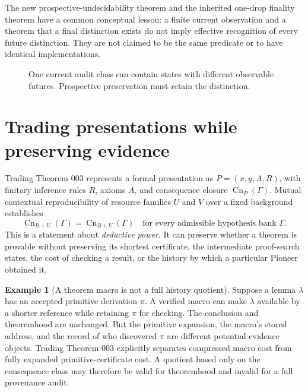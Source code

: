 \documentclass[11pt,letterpaper]{article}
\theoremstyle{definition}
\newtheorem{example}[theorem]{Example}
\begin{document}
The new prospective-undecidability theorem and the inherited one-drop finality theorem have a common conceptual lesson: a finite current observation and a theorem that a final distinction exists do not imply effective recognition of every future distinction. They are not claimed to be the same predicate or to have identical implementations.

\begin{figure}[htbp]\centering
{}
\caption{One current audit class can contain states with different observable futures. Prospective preservation must retain the distinction.}
\label{fig:future-split}
\end{figure}

\section{Trading presentations while preserving evidence}\label{sec:trades}
Trading Theorem 003 represents a formal presentation as $P=(x,y,A,R)$, with finitary inference rules $R$, axioms $A$, and consequence closure $\operatorname{Cn}_P(\Gamma)$. Mutual contextual reproducibility of resource families $U$ and $V$ over a fixed background establishes
\[
\operatorname{Cn}_{B+U}(\Gamma)=\operatorname{Cn}_{B+V}(\Gamma)
\quad\text{for every admissible hypothesis bank }\Gamma.
\]
This is a statement about \emph{deductive power}. It can preserve whether a theorem is provable without preserving its shortest certificate, the intermediate proof-search states, the cost of checking a result, or the history by which a particular Pioneer obtained it.

\begin{example}[A theorem macro is not a full history quotient]
Suppose a lemma $\lambda$ has an accepted primitive derivation $\pi$. A verified macro can make $\lambda$ available by a shorter reference while retaining $\pi$ for checking. The conclusion and theoremhood are unchanged. But the primitive expansion, the macro's stored address, and the record of who discovered $\pi$ are different potential evidence objects. Trading Theorem 003 explicitly separates compressed macro cost from fully expanded primitive-certificate cost. A quotient based only on the consequence class may therefore be valid for theoremhood and invalid for a full provenance audit.
\end{example}
\end{document}
